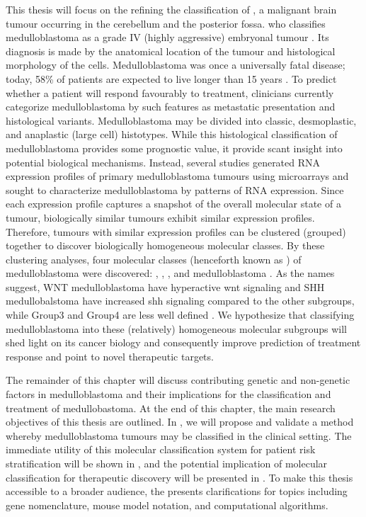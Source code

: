 This thesis will focus on the refining the classification of , a malignant brain tumour occurring in the cerebellum and the posterior fossa. \gls{who} classifies medulloblastoma as a grade IV (highly aggressive) embryonal tumour . Its diagnosis is made by the anatomical location of the tumour and histological morphology of the cells. Medulloblastoma was once a universally fatal disease; today, 58\% of patients are expected to live longer than 15 years . To predict whether a patient will respond favourably to treatment, clinicians currently categorize medulloblastoma by such features as metastatic presentation and histological variants. Medulloblastoma may be divided into classic, desmoplastic, and anaplastic (large cell) histotypes. While this histological classification of medulloblastoma provides some prognostic value, it provide scant insight into potential biological mechanisms. Instead, several studies generated RNA expression profiles of primary medulloblastoma tumours using microarrays and sought to characterize medulloblastoma by patterns of RNA expression. Since each expression profile captures a snapshot of the overall molecular state of a tumour, biologically similar tumours exhibit similar expression profiles. Therefore, tumours with similar expression profiles can be clustered (grouped) together to discover biologically homogeneous molecular classes. By these clustering analyses, four molecular classes (henceforth known as ) of medulloblastoma were discovered: , , , and  medulloblastoma . As the names suggest, WNT medulloblastoma have hyperactive \gls{wnt} signaling and SHH medullobalstoma have increased \gls{shh} signaling compared to the other subgroups, while Group3 and Group4 are less well defined . We hypothesize that classifying medulloblastoma into these (relatively) homogeneous molecular subgroups will shed light on its cancer biology and consequently improve prediction of treatment response and point to novel therapeutic targets.

The remainder of this chapter will discuss contributing genetic and non-genetic factors in medulloblastoma and their implications for the classification and treatment of medullobastoma. At the end of this chapter, the main research objectives of this thesis are outlined. In , we will propose and validate a method whereby medulloblastoma tumours may be classified in the clinical setting. The immediate utility of this molecular classification system for patient risk stratification will be shown in , and the potential implication of molecular classification for therapeutic discovery will be presented in . To make this thesis accessible to a broader audience, the  presents clarifications for topics including gene nomenclature, mouse model notation, and computational algorithms.


